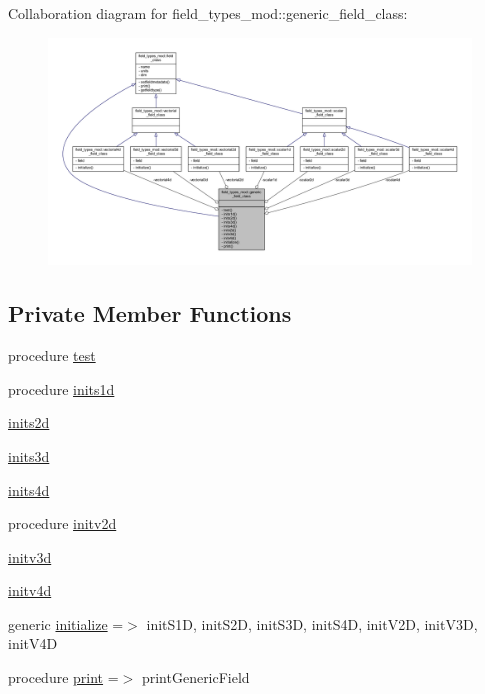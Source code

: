 Collaboration diagram for field\+\_\+types\+\_\+mod\+:\+:generic\+\_\+field\+\_\+class\+:\nopagebreak
\begin{figure}[H]
\begin{center}
\leavevmode
\includegraphics[width=350pt]{structfield__types__mod_1_1generic__field__class__coll__graph}
\end{center}
\end{figure}
\subsection*{Private Member Functions}
\begin{DoxyCompactItemize}
\item 
procedure \mbox{\hyperlink{structfield__types__mod_1_1generic__field__class_a1b14630d6dd71ef2baf38ba633aac892}{test}}
\item 
procedure \mbox{\hyperlink{structfield__types__mod_1_1generic__field__class_a967be57b1342ca6ebd74b9b5227f893a}{inits1d}}
\item 
\mbox{\hyperlink{structfield__types__mod_1_1generic__field__class_ac18a3be56bfc8e3ea62e1dc22f523047}{inits2d}}
\item 
\mbox{\hyperlink{structfield__types__mod_1_1generic__field__class_ac97e0b49d05017b71d103b0fd38d5a30}{inits3d}}
\item 
\mbox{\hyperlink{structfield__types__mod_1_1generic__field__class_acda5aead49c8f1d2496e0ebed4b36e91}{inits4d}}
\item 
procedure \mbox{\hyperlink{structfield__types__mod_1_1generic__field__class_a98fda233bdbffdbc38f587954ffff046}{initv2d}}
\item 
\mbox{\hyperlink{structfield__types__mod_1_1generic__field__class_a9af88bc93a603945b14ded12058cfc3b}{initv3d}}
\item 
\mbox{\hyperlink{structfield__types__mod_1_1generic__field__class_a52d0285dd7ed99214a08ff3794a611b2}{initv4d}}
\item 
generic \mbox{\hyperlink{structfield__types__mod_1_1generic__field__class_ae53b0ee80d41ad66189ad515edc23a3c}{initialize}} =$>$ init\+S1D, init\+S2D, init\+S3D, init\+S4D, init\+V2D, init\+V3D, init\+V4D
\item 
procedure \mbox{\hyperlink{structfield__types__mod_1_1generic__field__class_aec2db38662ff4ee6b7dd018f60da6321}{print}} =$>$ print\+Generic\+Field
\end{DoxyCompactItemize}
